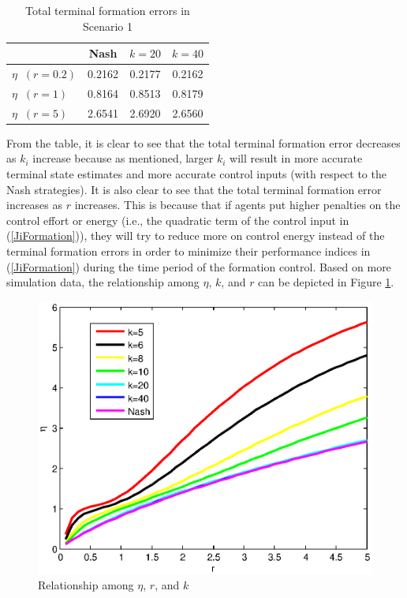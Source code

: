 \documentclass[12pt,draftcls,onecolumn]{IEEEtran}  %
\begin{document}
{\begin{table}[h]
\begin{tabular}{|l|c|c|c|}
         & Nash & $k=20$ & $k=40$ \\
         \hline
         $\eta\;\;(r=0.2)$ & 0.2162 & 0.2177 & 0.2162 \\
         \hline
  $\eta\;\;(r=1)$ &  0.8164 &  0.8513 & 0.8179 \\
  \hline
  $\eta\;\;(r=5)$ &  2.6541 & 2.6920 & 2.6560 \\
  \hline
\end{tabular}
\caption{Total terminal formation errors in Scenario 1}\label{Comparison}
\end{table}
From the table, it is clear to see that the total terminal formation error decreases as $k_i$ increase because as mentioned, larger $k_i$ will result in more accurate terminal state estimates and more accurate control inputs (with respect to the Nash strategies). It is also clear to see that the total terminal formation error increases as $r$ increases. This is because that if agents put higher penalties on the control effort or energy (i.e., the quadratic term of the control input in (\ref{JiFormation})), they will try to reduce more on control energy instead of the terminal formation errors in order to minimize their performance indices in (\ref{JiFormation}) during the time period of the formation control. Based on more simulation data, the relationship among $\eta$, $k$, and $r$ can be depicted in Figure \ref{Relationship}.
\begin{figure}[h]
      \centering
      \includegraphics[scale=0.5]{PlotT.eps}
      \caption{Relationship among $\eta$, $r$, and $k$}\label{Relationship}

\end{figure}}
\end{document}
